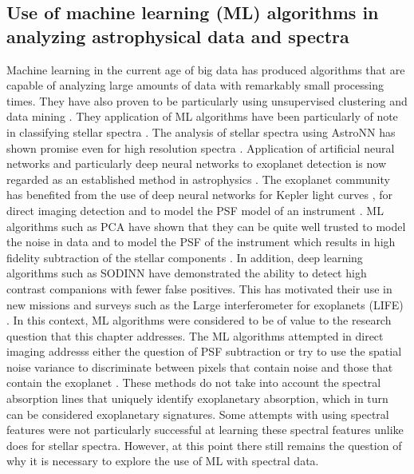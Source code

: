 \subsection{Use of machine learning (ML) algorithms in analyzing astrophysical data and spectra}
Machine learning in the current age of big data has produced algorithms that are capable of analyzing large amounts of data with remarkably small processing times.
They have also proven to be particularly using unsupervised clustering and data mining \citep[e.g][]{2019Baron,2010IBall,2014IVESCI}.
They application of ML algorithms have been particularly of note in classifying stellar spectra \citep[e.g][]{2018Miettinen,2018Naul}.
The analysis of stellar spectra using AstroNN has shown promise even for high resolution spectra \cite{2019Leung}.
Application of artificial neural networks and particularly deep neural networks to exoplanet detection is now regarded as an established method in astrophysics \cite{2020Fluke}.
The exoplanet community has benefited from the use of deep neural networks for Kepler light curves \cite{2018Pearson}, for direct imaging detection \cite{2018Gomez} and to model the PSF model of an instrument \cite{2022Gebhard}.
ML algorithms such as PCA have shown that they can be quite well trusted to model the noise in data \cite{2016A&AGomez} and to model the PSF of the instrument which results in high fidelity subtraction of the stellar components \cite{2014Meshkat}.
In addition, deep learning algorithms such as SODINN \cite{2018Gomez} have demonstrated the ability to detect high contrast companions with fewer false positives.
This has motivated their use in new missions and surveys such as the Large interferometer for exoplanets (LIFE) \cite{2021LIFE}.
In this context, ML algorithms were considered to be of value to the research question that this chapter addresses.
The ML algorithms attempted in direct imaging addresss either the question of PSF subtraction \citep[e.g][]{2022Gebhard} or try to use the spatial noise variance to discriminate between pixels that contain noise and those that contain the exoplanet \citep[e.g]{2018Gomez}.
These methods do not take into account the spectral absorption lines that uniquely identify exoplanetary absorption, which in turn can be considered exoplanetary signatures. 
Some attempts with using spectral features were not particularly successful \citep[e.g][]{2020Fisher} at learning these spectral features unlike \cite{2017RAALi} does for stellar spectra.
However, at this point there still remains the question of why it is necessary to explore the use of ML with spectral data.

